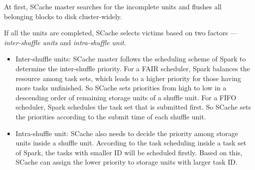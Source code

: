 At first, SCache master searches for the incomplete units and flushes all belonging blocks to disk cluster-widely.

If all the units are completed, SCache selects victims based on two factors --- \textit{inter-shuffle units} and \textit{intra-shuffle unit}.
\begin{itemize}[noitemsep]
	\item Inter-shuffle units: SCache master follows the scheduling scheme of Spark to determine the inter-shuffle priority. For a FAIR scheduler, Spark balances the resource among task sets, which leads to a higher priority for those having more tasks unfinished. So SCache sets priorities from high to low in a descending order of remaining storage units of a shuffle unit. For a FIFO scheduler, Spark schedules the task set that is submitted first. So SCache sets the priorities according to the submit time of each shuffle unit.
	\item Intra-shuffle unit: SCache also needs to decide the priority among storage units inside a shuffle unit. According to the task scheduling inside a task set of Spark, the tasks with smaller ID will be scheduled firstly. Based on this, SCache can assign the lower priority to storage units with larger task ID.
\end{itemize}

